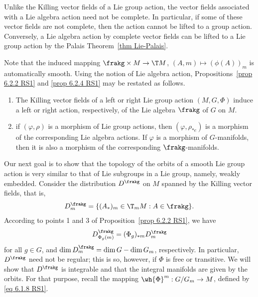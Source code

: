 Unlike the Killing vector fields of a Lie group action, the vector fields associated with a Lie algebra action need not be complete. In particular, if some of these vector fields are not complete, then the action cannot be lifted to a group action. Conversely, a Lie algebra action by complete vector fields can be lifted to a Lie group action by the Palais Theorem~\ref{thm Lie-Palais}.

Note that the induced mapping $\frakg\times M\to \T M$, $(A,m)\mapsto (\phi(A))_m$ is automatically smooth. Using the notion of Lie algebra action, Propositions~\ref{prop 6.2.2 RS1} and \ref{prop 6.2.4 RS1} may be restated as follows.

\begin{cor}[{{\cite[Cor.~6.2.7]{RS1}}}]
    \begin{enumerate}
        \item The Killing vector fields of a left or right Lie group action $(M,G,\Phi)$ induce a left or right action, respectively, of the Lie algebra $\frakg$ of $G$ on $M$.
        \item if $(\varphi,\rho)$ is a morphism of Lie group actions, then $(\varphi,\rho_{\ast e})$ is a morphism of the corresponding Lie algebra actions. If $\varphi$ is a morphism of $G$-manifolds, then it is also a morphism of the corresponding $\frakg$-manifolds.
    \end{enumerate}
\end{cor}

Our next goal is to show that the topology of the orbits of a smooth Lie group action is very similar to that of Lie subgroups in a Lie group, namely, weakly embedded. Consider the distribution $D^\frakg$ on $M$ spanned by the Killing vector fields, that is,
\[D^\frakg_m=\{(A_\ast)_m\in \T_m M:A\in \frakg\}.\]
According to points 1 and 3 of Proposition~\ref{prop 6.2.2 RS1}, we have
\[D^\frakg_{\Phi_g(m)}=(\Phi_g)_{\ast m}D^\frakg_m\label{eq 6.2.4 RS1}\]
for all $g\in G$, and $\dim D_m^\frakg=\dim G-\dim G_m$, respectively. In particular, $D^\frakg$ need not be regular; this is so, however, if $\Phi$ is free or transitive. We will show that $D^\frakg$ is integrable and that the integral manifolds are given by the orbits. For that purpose, recall the mapping $\wh{\Phi}^m:G\slash G_m\to M$, defined by \eqref{eq 6.1.8 RS1}.

